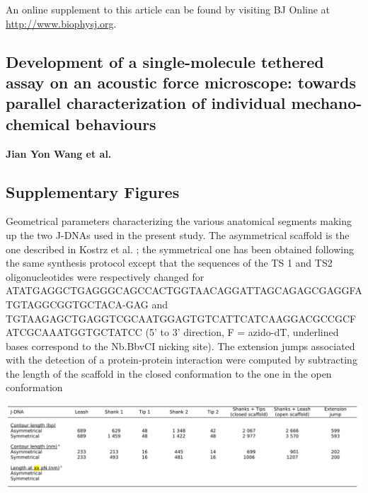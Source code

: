 \documentclass{biophys-new}
\begin{document}
An online supplement to this article can be found by visiting BJ Online at \url{http://www.biophysj.org}.

\subsection*{Development of a single-molecule tethered assay on an acoustic force microscope: towards parallel characterization of individual mechano-chemical behaviours}

\textbf{ Jian Yon Wang et al.}


\setcounter{figure}{0}
\makeatletter 
\renewcommand{\thefigure}{S\@arabic\c@figure}
\makeatother
\setcounter{table}{0}
\makeatletter 
\renewcommand{\thetable}{S\@arabic\c@table}
\makeatother

\subsection*{Supplementary Figures}

\begin{table}[hbt!] %
	\caption{Geometrical parameters characterizing the various anatomical segments making up the two J-DNAs used in the present study. The asymmetrical scaffold is the one described in Kostrz et al. \cite{kostrz2019}; the symmetrical one has been obtained following the same synthesis protocol except that the sequences of the TS 1 and TS2 oligonucleotides were respectively changed for
		ATATGAGGCTGAGGGCAGCCACTGGTAACAGGATTAGCAGAGCGAGGFATGTAGGCGGTGCTACA-GAG
		and
		TGTAAGAGCTGAGGTCGCAATGGAGTGTCATTCATCAAGGACGCCGCFATCGCAAATGGTGCTATCC (5’ to 3’ direction, F = azido-dT, underlined bases correspond to the Nb.BbvCI nicking site). The extension jumps associated with the detection of a protein-protein interaction were computed by subtracting the length of the scaffold in the closed conformation to the one in the open conformation}
	\label{tbl:s1}
	\includegraphics[width=\linewidth]{Figures/TableS1pdf.png}
\end{table}
\end{document}
